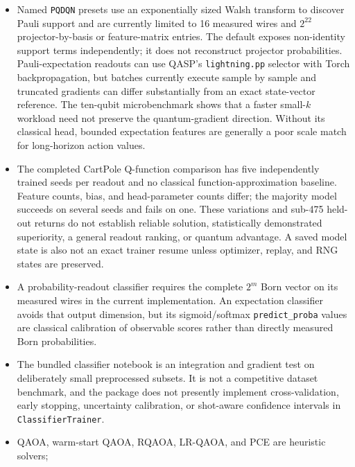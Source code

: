 \documentclass[10pt]{article}
\newcommand{\code}[1]{\texttt{#1}}
\begin{document}
\begin{itemize}
        action or class masses before learning; block membership, unused wires,
        and the reference prior must be reported.
  \item Named \code{PQDQN} presets use an exponentially sized Walsh transform
        to discover Pauli support and are currently limited to 16 measured
        wires and $2^{22}$ projector-by-basis or feature-matrix entries.  The
        default exposes non-identity support terms independently; it does not
        reconstruct projector probabilities.  Pauli-expectation readouts can
        use QASP's \code{lightning.pp} selector with Torch backpropagation, but
        batches currently execute sample by sample and truncated gradients can
        differ substantially from an exact state-vector reference.  The
        ten-qubit microbenchmark shows that a faster small-$k$ workload need
        not preserve the quantum-gradient direction.  Without its classical
        head, bounded expectation features are generally a poor scale match
        for long-horizon action values.
  \item The completed CartPole Q-function comparison has five independently
        trained seeds per readout and no classical function-approximation
        baseline.  Feature counts, bias, and head-parameter counts differ; the
        majority model succeeds on several seeds and fails on one.  These
        variations and sub-475 held-out returns do not establish reliable
        solution, statistically demonstrated superiority, a general readout
        ranking, or quantum advantage.  A saved model state is also not an exact trainer
        resume unless optimizer, replay, and RNG states are preserved.
  \item A probability-readout classifier requires the complete $2^m$ Born
        vector on its measured wires in the current implementation.  An
        expectation classifier avoids that output dimension, but its
        sigmoid/softmax \code{predict\_proba} values are classical calibration
        of observable scores rather than directly measured Born probabilities.
  \item The bundled classifier notebook is an integration and gradient test on
        deliberately small preprocessed subsets.  It is not a competitive
        dataset benchmark, and the package does not presently implement
        cross-validation, early stopping, uncertainty calibration, or
        shot-aware confidence intervals in \code{ClassifierTrainer}.
  \item QAOA, warm-start QAOA, RQAOA, LR-QAOA, and PCE are heuristic solvers;

\end{itemize}
\end{document}
